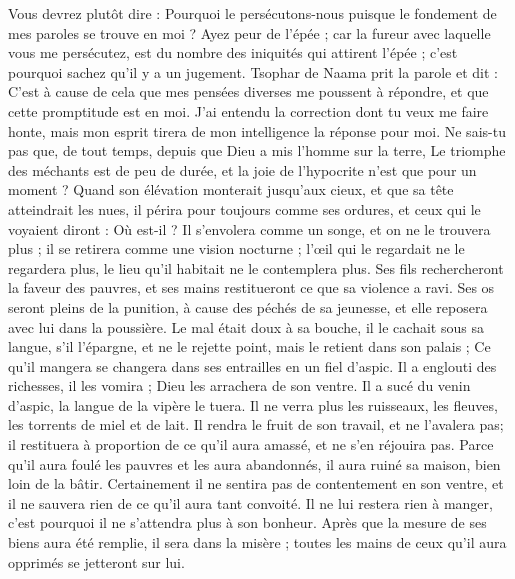 \begin{multicols}{2}
{Vous devrez plutôt dire : Pourquoi le persécutons-nous puisque le fondement de mes paroles se trouve en moi ?
Ayez peur de l'épée ; car la fureur avec laquelle vous me persécutez, est du nombre des iniquités qui attirent l'épée ; c'est pourquoi sachez qu'il y a un jugement.
\VerseOne{}Tsophar de Naama prit la parole et dit :
C'est à cause de cela que mes pensées diverses me poussent à répondre, et que cette promptitude est en moi. 
J'ai entendu la correction dont tu veux me faire honte, mais mon esprit tirera de mon intelligence la réponse pour moi. 
Ne sais-tu pas que, de tout temps, depuis que Dieu a mis l'homme sur la terre, 
Le triomphe des méchants est de peu de durée, et la joie de l'hypocrite n'est que pour un moment  ?
Quand son élévation monterait jusqu'aux cieux, et que sa tête atteindrait les nues,
il périra pour toujours comme ses ordures, et ceux qui le voyaient diront : Où est-il ?
Il s'envolera comme un songe, et on ne le trouvera plus ; il se  retirera comme une vision nocturne ;
l'œil qui le regardait ne le regardera plus, le lieu qu'il habitait ne le contemplera plus.
Ses fils rechercheront la faveur des pauvres, et ses mains restitueront ce que sa violence a ravi.
Ses os seront pleins de la punition, à  cause des péchés de sa jeunesse, et elle reposera avec lui dans la poussière.
Le mal était doux à sa bouche, il le cachait sous sa langue,
s'il l'épargne, et ne le rejette point, mais le retient dans son palais ; 
Ce qu'il mangera se changera dans ses entrailles en un fiel d'aspic.
Il a englouti des richesses, il les vomira ; Dieu les arrachera de son ventre.
Il a sucé du venin d'aspic, la langue de la vipère le tuera.
Il ne verra plus les ruisseaux, les fleuves, les torrents de miel et de lait.
Il rendra le fruit de son travail, et ne l'avalera pas; il restituera à proportion de ce qu'il aura amassé, et ne s'en réjouira pas.
Parce qu'il aura foulé les pauvres et les aura abandonnés, il aura ruiné sa maison, bien loin de la bâtir. 
Certainement il ne sentira pas de contentement en son ventre, et il ne sauvera rien de ce qu'il aura tant convoité.
Il ne lui restera rien à manger, c'est pourquoi il ne s'attendra plus à son bonheur.
Après que la mesure de ses biens aura été remplie, il sera dans la misère ; toutes les mains de ceux qu'il aura opprimés se jetteront sur lui.
}
\end{multicols}
